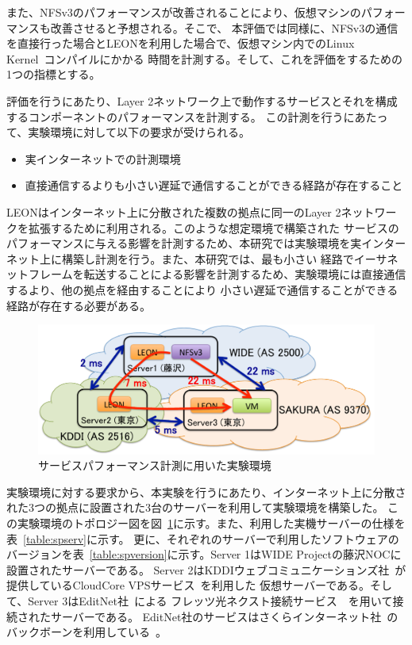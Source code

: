 また、NFSv3のパフォーマンスが改善されることにより、仮想マシンのパフォーマンスも改善させると予想される。そこで、
本評価では同様に、NFSv3の通信を直接行った場合とLEONを利用した場合で、仮想マシン内でのLinux Kernel~\cite{linuxkernel}コンパイルにかかる
時間を計測する。そして、これを評価をするための1つの指標とする。

評価を行うにあたり、Layer 2ネットワーク上で動作するサービスとそれを構成するコンポーネントのパフォーマンスを計測する。
この計測を行うにあたって、実験環境に対して以下の要求が受けられる。

\begin{itemize}
	\item{実インターネットでの計測環境}
	\item{直接通信するよりも小さい遅延で通信することができる経路が存在すること}
\end{itemize}

LEONはインターネット上に分散された複数の拠点に同一のLayer 2ネットワークを拡張するために利用される。このような想定環境で構築された
サービスのパフォーマンスに与える影響を計測するため、本研究では実験環境を実インターネット上に構築し計測を行う。また、本研究では、最も小さい
経路でイーサネットフレームを転送することによる影響を計測するため、実験環境には直接通信するより、他の拠点を経由することにより
小さい遅延で通信することができる経路が存在する必要がある。

\begin{figure}
	\begin{center}
		\includegraphics[scale=0.65]{./img/spexp}
		\caption{サービスパフォーマンス計測に用いた実験環境}
		\label{img:spexp}
	\end{center}
\end{figure}

実験環境に対する要求から、本実験を行うにあたり、インターネット上に分散された3つの拠点に設置された3台のサーバーを利用して実験環境を構築した。
この実験環境のトポロジー図を図~\ref{img:spexp}に示す。また、利用した実機サーバーの仕様を表~\ref{table:spserv}に示す。
更に、それぞれのサーバーで利用したソフトウェアのバージョンを表~\ref{table:spversion}に示す。Server 1はWIDE Projectの藤沢NOCに設置されたサーバーである。
Server 2はKDDIウェブコミュニケーションズ社~\cite{kddiwebcom}が提供しているCloudCore VPSサービス~\cite{cloudcore}を利用した
仮想サーバーである。そして、Server 3はEditNet社~\cite{editnet}による
フレッツ光ネクスト接続サービス~\cite{enflets}~\cite{nttflets}を用いて接続されたサーバーである。
EditNet社のサービスはさくらインターネット社~\cite{sakurainc}のバックボーンを利用している~\cite{enbb}。


